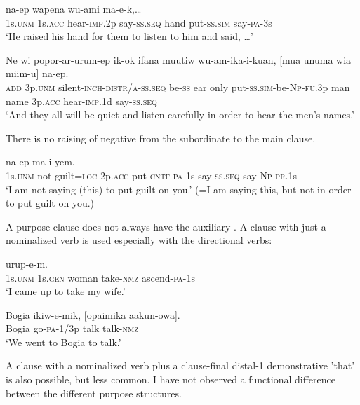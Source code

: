 \ea%
\label{ex:8:x1619}
 na-ep wapena wu-ami ma-e-k,{\dots}\\
1s.\textsc{unm} 1s.\textsc{acc} hear-\textsc{imp}.2p say-\textsc{ss}.\textsc{seq} hand put-\textsc{ss}.\textsc{sim} say-\textsc{pa}-3s\\
\glt`He raised his hand for them to listen to him and said, {\dots}'
\z


\ea%
\label{ex:8:x1627}
\gll Ne  wi  popor-ar-urum-ep  ik-ok  ifana  muutiw wu-am-ika-i-kuan,  [mua  unuma  wia  miim-u] na-ep.\\
\textsc{add} 3p.\textsc{unm} silent-\textsc{inch}-\textsc{distr}/\textsc{a}-\textsc{ss}.\textsc{seq} be-\textsc{ss} ear  only put-\textsc{ss}.\textsc{sim}-be-\textsc{Np}-\textsc{fu}.3p  man  name  3p.\textsc{acc} hear-\textsc{imp}.1d say-\textsc{ss}.\textsc{seq}\\
\glt`And they all will be quiet and listen carefully in order to hear the men's names.'
\z


There is no raising of negative from the subordinate to the main clause. 

\ea%
\label{ex:8:x1623}
\gll [Yo  me  pina=pa  nia  wu-ek-a-m]  na-ep ma-i-yem. \\
1s.\textsc{unm} not guilt=\textsc{loc} 2p.\textsc{acc} put-\textsc{cntf}-\textsc{pa}-1s say-\textsc{ss}.\textsc{seq} say-\textsc{Np}-\textsc{pr}.1s\\
\glt`I am not saying (this) to put guilt on you.' (=I am saying this, but not in order to put guilt on you.)
\z


A purpose clause does not always have the auxiliary . A clause with just a nominalized verb is used especially with the directional verbs: 

\ea%
\label{ex:8:x1659}
  urup-e-m.\\
1s.\textsc{unm} 1s.\textsc{gen} woman take-\textsc{nmz} ascend-\textsc{pa}-1s\\
\glt`I came up to take my wife.'
\z


\ea%
\label{ex:8:x1658}
\gll Bogia  ikiw-e-mik,  [opaimika  aakun-owa]. \\
Bogia  go-\textsc{pa}-1/3p talk talk-\textsc{nmz}\\
\glt`We went to Bogia to talk.'
\z


A clause with a nominalized verb plus a clause-final distal-1 demonstrative  'that' is also possible, but less common. I have not observed a functional difference between the different purpose structures.

